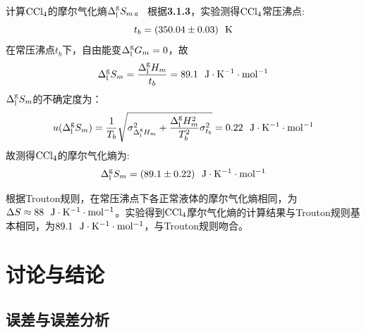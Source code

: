 \documentclass[12pt]{article}
\begin{document}
		计算$\rm CCl_{4}$的摩尔气化熵$\Delta^{\rm g}_{\rm l}S_{m}$。
		根据\textbf{3.1.3}，实验测得$\rm CCl_{4}$常压沸点:
		$$
			t_{b}=(350.04\pm 0.03)\ \ {\rm K}
		$$
		在常压沸点$t_{b}$下，自由能变$\Delta^{\rm g}_{\rm l}G_{m}=0$，故
		$$
			\Delta^{\rm g}_{\rm l}S_{m}=\frac{\Delta^{\rm g}_{\rm l}H_{m}}{t_{b}}=89.1\ \ {\rm J\cdot K^{-1}\cdot mol^{-1}}
		$$
		$\Delta^{\rm g}_{\rm l}S_{m}$的不确定度为：
		$$
			u(\Delta^{\rm g}_{\rm l}S_{m})=\frac{1}{T_{b}} \sqrt{\sigma^{2}_{\Delta^{\rm g}_{\rm l}H_{m}}+\frac{\Delta^{\rm g}_{\rm l}H_{m}^{2}}{T_{b}^{2}}\sigma^{2}_{t_{b}}}=0.22\ \ {\rm J\cdot K^{-1}\cdot mol^{-1}}
		$$
		故测得$\rm CCl_{4}$的摩尔气化熵为:
		$$
			\Delta^{\rm g}_{\rm l}S_{m}=(89.1\pm 0.22)\ \ {\rm J\cdot K^{-1}\cdot mol^{-1}}
		$$
		\par
		根据Trouton规则，在常压沸点下各正常液体的摩尔气化熵相同，为$\Delta S\approx 88\ \ {\rm J\cdot K^{-1}\cdot mol^{-1}}$。实验得到$\rm CCl_{4}$摩尔气化熵的计算结果与Trouton规则基本相同，为$89.1\ \ {\rm J\cdot K^{-1}\cdot mol^{-1}}$，与Trouton规则吻合。

 	\section{讨论与结论}
	 \subsection{误差与误差分析}
\end{document}
